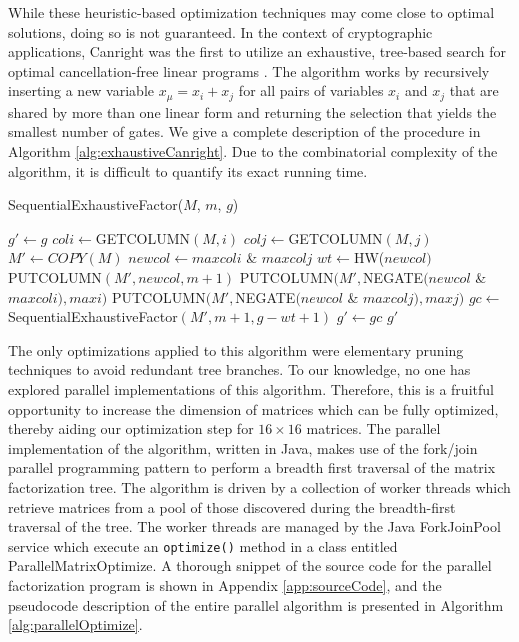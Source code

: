 While these heuristic-based optimization techniques may come close to optimal solutions, doing so is not guaranteed. In the context of cryptographic applications, Canright was the first to utilize an exhaustive, tree-based search for optimal cancellation-free linear programs \cite{Canright05-1}. The algorithm works by recursively inserting a new variable $x_{\mu} = x_i + x_j$ for all pairs of variables $x_i$ and $x_j$ that are shared by more than one linear form and returning the selection that yields the smallest number of gates. We give a complete description of the procedure in Algorithm \ref{alg:exhaustiveCanright}. Due to the combinatorial complexity of the algorithm, it is difficult to quantify its exact running time. 

\begin{algorithm}[ht!] %
\caption{SequentialExhaustiveFactor($M$, $m$, $g$)} \label{alg:exhaustiveCanright}
\begin{algorithmic}[1]
	\State $g' \gets g$
			\State $coli \gets $GETCOLUMN$(M, i)$
			\State $colj \gets $GETCOLUMN$(M, j)$
				\State $M' \gets COPY(M)$
				\State $newcol \gets maxcoli $ \& $ maxcolj$
				\State $wt \gets $HW($newcol)$
				\State PUTCOLUMN$(M', newcol, m + 1)$
				\State PUTCOLUMN$(M', $NEGATE$(newcol $ \& $ maxcoli), maxi)$
				\State PUTCOLUMN$(M', $NEGATE$(newcol $ \& $ maxcolj), maxj)$
				\State $gc \gets $SequentialExhaustiveFactor$(M', m+1, g - wt + 1)$
					\State $g' \gets gc$
				\EndIf
			\EndIf
		\EndFor
	\EndFor
	\State \Return $g'$ 
\end{algorithmic}
\end{algorithm}

The only optimizations applied to this algorithm were elementary pruning techniques to avoid redundant tree branches. To our knowledge, no one has explored parallel implementations of this algorithm. Therefore, this is a fruitful opportunity to increase the dimension of matrices which can be fully optimized, thereby aiding our optimization step for $16 \times 16$ matrices. The parallel implementation of the algorithm, written in Java, makes use of the fork/join parallel programming pattern to perform a breadth first traversal of the matrix factorization tree. The algorithm is driven by a collection of worker threads which retrieve matrices from a pool of those discovered during the breadth-first traversal of the tree. The worker threads are managed by the Java ForkJoinPool service which execute an {\tt optimize()} method in a class entitled ParallelMatrixOptimize. A thorough snippet of the source code for the parallel factorization program is shown in Appendix \ref{app:sourceCode}, and the pseudocode description of the entire parallel algorithm is presented in Algorithm \ref{alg:parallelOptimize}.

